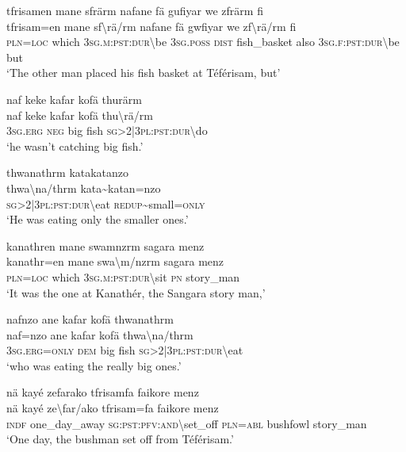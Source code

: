 \ea\label{ex:3:a7525}
tfrisamen mane sfrärm nafane fä gufiyar we zfrärm fi\\
\gll tfrisam=en	mane	sf{\textbackslash}rä/rm	nafane	fä	gwfiyar	we	zf{\textbackslash}rä/rm	fi\\
     \textsc{pln}=\textsc{loc}	which	3\textsc{sg}.\textsc{m}:\textsc{pst}:\textsc{dur}{\textbackslash}be	3\textsc{sg}.\textsc{poss}	\textsc{dist}	fish\_basket	also	3\textsc{sg}.\textsc{f}:\textsc{pst}:\textsc{dur}{\textbackslash}be	but\\
\glt `The other man placed his fish basket at Téférisam, but'
\z

\newpage
\ea\label{ex:3:a7527}
naf keke kafar kofä thurärm\\
\gll naf	keke	kafar	kofä	thu{\textbackslash}rä/rm\\
     3\textsc{sg}.\textsc{erg}	\textsc{neg}	big	fish	\textsc{sg}>2|3\textsc{pl}:\textsc{pst}:\textsc{dur}{\textbackslash}do\\
\glt `he wasn't catching big fish.'
\z

\ea\label{ex:3:a7529}
thwanathrm katakatanzo\\
\gll thwa{\textbackslash}na/thrm	kata{\textasciitilde}katan=nzo\\
     \textsc{sg}>2|3\textsc{pl}:\textsc{pst}:\textsc{dur}{\textbackslash}eat	\textsc{redup}{\textasciitilde}small=\textsc{only}\\
\glt `He was eating only the smaller ones.'
\z

\ea\label{ex:3:a7530}
kanathren mane swamnzrm sagara menz\\
\gll kanathr=en	mane	swa{\textbackslash}m/nzrm	sagara	menz\\
     \textsc{pln}=\textsc{loc}	which	3\textsc{sg}.\textsc{m}:\textsc{pst}:\textsc{dur}{\textbackslash}sit	\textsc{pn}	story\_man\\
\glt `It was the one at Kanathér, the Sangara story man,'
\z

\ea\label{ex:3:a7532}
nafnzo ane kafar kofä thwanathrm\\
\gll naf=nzo	ane	kafar	kofä	thwa{\textbackslash}na/thrm\\
     3\textsc{sg}.\textsc{erg}=\textsc{only}	\textsc{dem}	big	fish	\textsc{sg}>2|3\textsc{pl}:\textsc{pst}:\textsc{dur}{\textbackslash}eat\\
\glt `who was eating the really big ones.'
\z

\ea\label{ex:3:a7534}
nä kayé zefarako tfrisamfa faikore menz\\
\gll nä	kayé	ze{\textbackslash}far/ako	tfrisam=fa	faikore	menz\\
     \textsc{indf}	one\_day\_away	\textsc{sg}:\textsc{pst}:\textsc{pfv}:\textsc{and}{\textbackslash}set\_off	\textsc{pln}=\textsc{abl}	bushfowl	story\_man\\
\glt `One day, the bushman set off from Téférisam.'
\z


